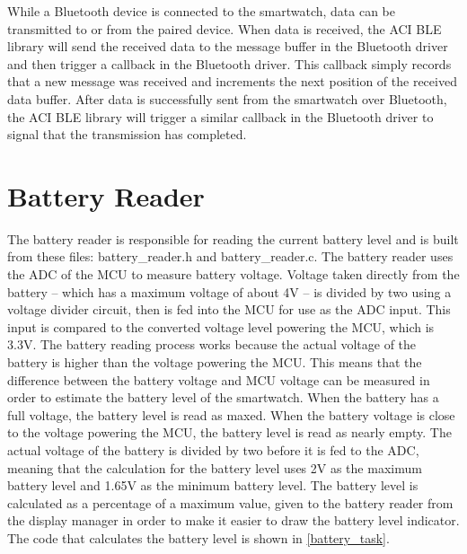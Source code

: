 While a Bluetooth device is connected to the smartwatch, data can be transmitted to or from the paired device. When data is received, the ACI BLE library will send the received data to the message buffer in the Bluetooth driver and then trigger a callback in the Bluetooth driver. This callback simply records that a new message was received and increments the next position of the received data buffer. After data is successfully sent from the smartwatch over Bluetooth, the ACI BLE library will trigger a similar callback in the Bluetooth driver to signal that the transmission has completed.

\nl

\section{Battery Reader}
The battery reader is responsible for reading the current battery level and is built from these files: battery\_reader.h and battery\_reader.c. The battery reader uses the ADC of the MCU to measure battery voltage. Voltage taken directly from the battery -- which has a maximum voltage of about 4V -- is divided by two using a voltage divider circuit, then is fed into the MCU for use as the ADC input. This input is compared to the converted voltage level powering the MCU, which is 3.3V. The battery reading process works because the actual voltage of the battery is higher than the voltage powering the MCU. This means that the difference between the battery voltage and MCU voltage can be measured in order to estimate the battery level of the smartwatch. When the battery has a full voltage, the battery level is read as maxed. When the battery voltage is close to the voltage powering the MCU, the battery level is read as nearly empty. The actual voltage of the battery is divided by two before it is fed to the ADC, meaning that the calculation for the battery level uses 2V as the maximum battery level and 1.65V as the minimum battery level. The battery level is calculated as a percentage of a maximum value, given to the battery reader from the display manager in order to make it easier to draw the battery level indicator. The code that calculates the battery level is shown in \ref{battery_task}.

\nl

